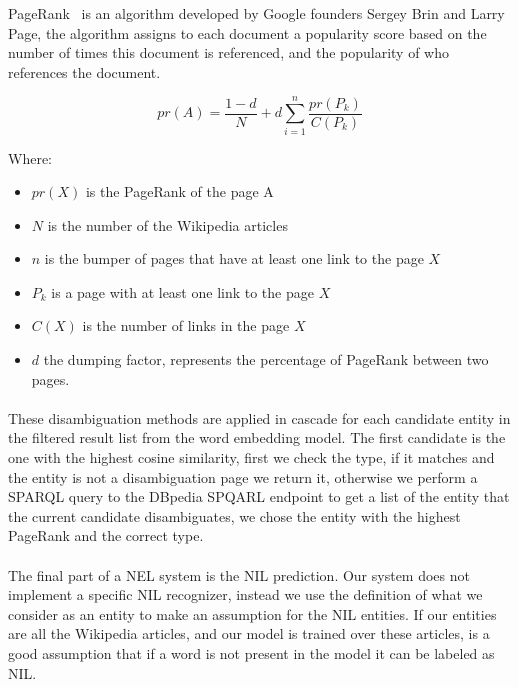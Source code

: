 PageRank~\cite{brin1998anatomy} is an algorithm developed by Google founders Sergey Brin and Larry Page, the algorithm assigns to each document a popularity score based on the number of times this document is referenced, and the popularity of who references the document.

\begin{equation}
pr(A) = \frac{1 - d}{N} + d \sum\limits_{i=1}^{n}\frac{pr(P_k)}{C(P_k)}
\end{equation}

Where:
\begin{itemize}[noitemsep]
\item \(pr(X)\) is the PageRank of the page A
\item \(N\) is the number of the Wikipedia articles
\item \(n\) is the bumper of pages that have at least one link to the page \(X\)
\item \(P_k\) is a page with at least one link to the page \(X\)
\item \(C(X)\) is the number of links in the page \(X\)
\item \(d\) the dumping factor, represents the percentage of PageRank between two pages.
\end{itemize}

\paragraph{}
These disambiguation methods are applied in cascade for each candidate entity in the filtered result list from the word embedding model. The first candidate is the one with the highest cosine similarity, first we check the type, if it matches and the entity is not a disambiguation page we return it, otherwise we perform a SPARQL query to the DBpedia SPQARL endpoint to get a list of the entity that the current candidate disambiguates, we chose the entity with the highest PageRank and the correct type.

\paragraph{}
The final part of a NEL system is the NIL prediction. Our system does not implement a specific NIL recognizer, instead we use the definition of what we consider as an entity to make an assumption for the NIL entities. If our entities are all the Wikipedia articles, and our model is trained over these articles, is a good assumption that if a word is not present in the model it can be labeled as NIL.  



